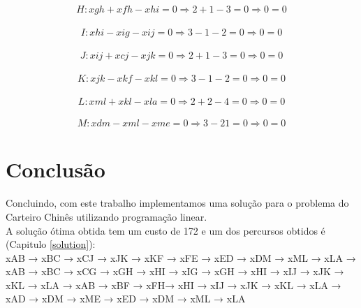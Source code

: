 \documentclass[a4paper]{report}
\begin{document}
\begin{multline}
H: xgh + xfh - xhi = 0
\Rightarrow 2 + 1 - 3 = 0
\Rightarrow 0 = 0
\end{multline}

\begin{multline}
I: xhi - xig - xij = 0
\Rightarrow 3 - 1 - 2 = 0
\Rightarrow 0 = 0
\end{multline}

\begin{multline}
J: xij + xcj - xjk = 0
\Rightarrow 2 + 1 - 3 = 0
\Rightarrow 0 = 0
\end{multline}

\begin{multline}
K: xjk - xkf - xkl = 0
\Rightarrow 3 - 1 - 2 = 0
\Rightarrow 0 = 0
\end{multline}

\begin{multline}
L: xml + xkl - xla = 0
\Rightarrow 2 + 2 - 4 = 0
\Rightarrow 0 = 0
\end{multline}

\begin{multline}
M: xdm - xml - xme = 0
\Rightarrow 3 - 2 1 = 0
\Rightarrow 0 = 0
\end{multline}

\chapter{Conclusão}
Concluindo, com este trabalho implementamos uma solução para o problema do
Carteiro Chinês utilizando programação linear.\\
A solução ótima obtida tem um custo de 172 e um dos percursos obtidos é (Capitulo \ref{solution}):\\
xAB → xBC → xCJ → xJK → xKF → xFE → xED → xDM → xML → xLA →
xAB → xBC → xCG → xGH → xHI  → xIG → xGH → xHI → xIJ → xJK  → xKL  → xLA →
xAB → xBF → xFH→ xHI  → xIJ → xJK  → xKL  → xLA →
xAD → xDM → xME → xED  → xDM → xML → xLA\\
\end{document}
